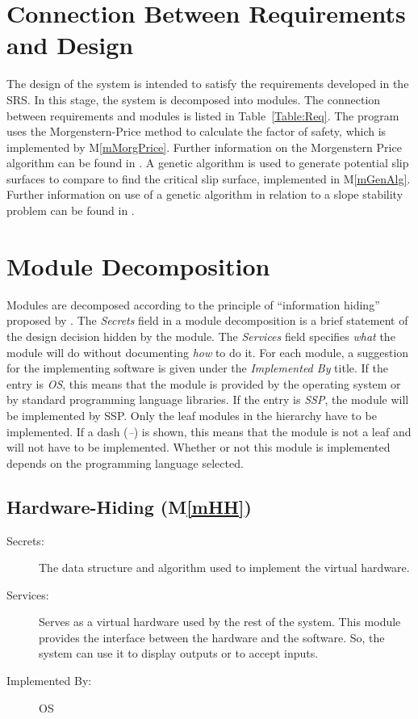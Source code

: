 \documentclass[12pt, titlepage]{article}
\newcommand{\progname}{SSP}
\newcommand{\mref}[1]{M\ref{#1}}
\begin{document}
\section{Connection Between Requirements and Design} \label{SecConnection}

\hspace{3ex}The design of the system is intended to satisfy the
requirements developed in the SRS. In this stage, the system is
decomposed into modules. The connection between requirements and
modules is listed in Table~\ref{Table:Req}. The program uses the 
Morgenstern-Price method to calculate the factor of safety, which is implemented
by \mref{mMorgPrice}. Further information on the Morgenstern Price algorithm 
can be found in \cite{ZhuEtAl2005}. A genetic algorithm is used to generate 
potential slip surfaces to compare to find the critical slip surface, 
implemented in \mref{mGenAlg}. Further information on use of a genetic 
algorithm in relation to a slope stability problem can be found in 
\cite{LiEtAl}.


\section{Module Decomposition} \label{SecMD}

\hspace{3ex}Modules are decomposed according to the principle of
``information hiding'' proposed by \citet{ParnasEtAl1984}. The
\emph{Secrets} field in a module decomposition is a brief statement of
the design decision hidden by the module. The \emph{Services} field
specifies \emph{what} the module will do without documenting
\emph{how} to do it. For each module, a suggestion for the
implementing software is given under the \emph{Implemented By}
title. If the entry is \emph{OS}, this means that the module is
provided by the operating system or by standard programming language
libraries. If the entry is \emph{\progname}, the module will be implemented by 
\progname. Only the leaf modules in the hierarchy have to be implemented. If a 
dash (\emph{--}) is shown, this means that the module is not a leaf and will 
not have to be implemented. Whether or not this module is implemented depends 
on the programming language selected.

\subsection{Hardware-Hiding (\mref{mHH})}

\begin{description}
\item[Secrets:]The data structure and algorithm used to implement the
  virtual hardware.
\item[Services:]Serves as a virtual hardware used by the rest of the
  system. This module provides the interface between the hardware and
  the software. So, the system can use it to display outputs or to
  accept inputs.
\item[Implemented By:] OS
\end{description}
\end{document}
